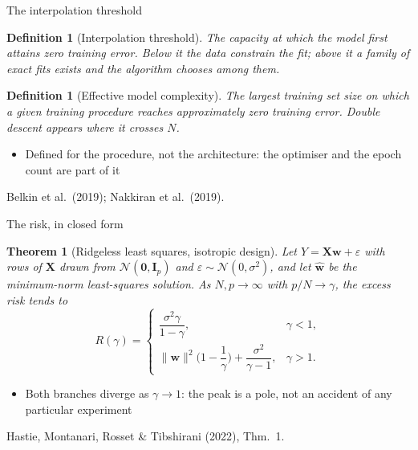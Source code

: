 \documentclass[aspectratio=169, 11pt]{beamer}
\newtheorem{defx}[theorem]{Definition}
\newtheorem{thmx}[theorem]{Theorem}
\newcommand{\srcline}[1]{%
  \par\vspace{0.25em}%
  {\scriptsize\color{mcMuted}\hfill #1\par}}
\newcommand{\src}[3]{}      %
\begin{document}
\begin{frame}{The interpolation threshold}
  \src{belkin2019}{figure}{1}
  \src{belkin2019}{section}{1}
  \src{nakkiran2020}{section}{2}
  \src{bishop2024}{section}{9.3.2}
  \vspace{-0.1em}
  \begin{defx}[Interpolation threshold]\label{th:thresh}
    \small
    The capacity at which the model first attains zero training error.
    Below it the data constrain the fit; above it a family of exact fits
    exists and the algorithm chooses among them.
  \end{defx}
  \vspace{0.2em}
  \begin{defx}[Effective model complexity]\label{th:emc}
    \small
    The largest training set size on which a given training procedure
    reaches approximately zero training error. Double descent appears
    where it crosses $N$.
  \end{defx}
  \vspace{0.15em}
  \begin{itemize}\itemsep0.25em
    \item Defined for the \alert{procedure}, not the architecture: the
          optimiser and the epoch count are part of it
  \end{itemize}
  \srcline{Belkin et al.\ (2019); Nakkiran et al.\ (2019).}
\end{frame}

\begin{frame}{The risk, in closed form}
  \src{hastie2022}{equation}{8}
  \src{hastie2022}{section}{3.2}
  \vspace{-0.25em}
  \begin{thmx}[Ridgeless least squares, isotropic design]\label{th:ridgeless}
    \small
    Let $Y = \mathbf{X}\mathbf{w} + \varepsilon$ with rows of $\mathbf{X}$ drawn from
    $\mathcal{N}(\mathbf{0}, \mathbf{I}_p)$ and $\varepsilon \sim \mathcal{N}(0, \sigma^2)$,
    and let $\hat{\mathbf{w}}$ be the minimum-norm least-squares solution.
    As $N, p \to \infty$ with $p/N \to \gamma$, the excess risk tends to
    \[
      R(\gamma) =
      \begin{cases}
        \dfrac{\sigma^2 \gamma}{1 - \gamma}, & \gamma < 1,\\[0.9em]
        \|\mathbf{w}\|^2\Big(1 - \dfrac{1}{\gamma}\Big)
          + \dfrac{\sigma^2}{\gamma - 1}, & \gamma > 1 .
      \end{cases}
    \]
  \end{thmx}
  \vspace{0.25em}
  \begin{itemize}\itemsep0.25em
    \item Both branches diverge as $\gamma \to 1$: the peak is a pole,
          not an accident of any particular experiment
  \end{itemize}
  \srcline{Hastie, Montanari, Rosset \& Tibshirani (2022), Thm.~1.}
\end{frame}
\end{document}
